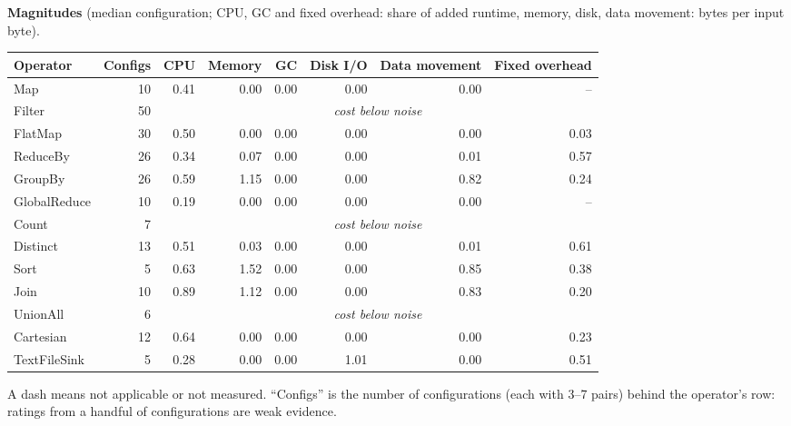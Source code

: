 \documentclass[11pt,a4paper]{article}
\begin{document}
\textbf{Magnitudes} (median configuration; CPU, GC and fixed overhead: share of added runtime, memory, disk, data movement: bytes per input byte).
\begin{center}\footnotesize\begin{tabular}{lrrrrrrr}\toprule

Operator & Configs & CPU & Memory & GC & Disk I/O & Data movement & Fixed overhead\\\midrule

Map & 10 & 0.41 & 0.00 & 0.00 & 0.00 & 0.00 & --\\

Filter & 50 & \multicolumn{6}{c}{\emph{cost below noise}}\\

FlatMap & 30 & 0.50 & 0.00 & 0.00 & 0.00 & 0.00 & 0.03\\

ReduceBy & 26 & 0.34 & 0.07 & 0.00 & 0.00 & 0.01 & 0.57\\

GroupBy & 26 & 0.59 & 1.15 & 0.00 & 0.00 & 0.82 & 0.24\\

GlobalReduce & 10 & 0.19 & 0.00 & 0.00 & 0.00 & 0.00 & --\\

Count & 7 & \multicolumn{6}{c}{\emph{cost below noise}}\\

Distinct & 13 & 0.51 & 0.03 & 0.00 & 0.00 & 0.01 & 0.61\\

Sort & 5 & 0.63 & 1.52 & 0.00 & 0.00 & 0.85 & 0.38\\

Join & 10 & 0.89 & 1.12 & 0.00 & 0.00 & 0.83 & 0.20\\

UnionAll & 6 & \multicolumn{6}{c}{\emph{cost below noise}}\\

Cartesian & 12 & 0.64 & 0.00 & 0.00 & 0.00 & 0.00 & 0.23\\

TextFileSink & 5 & 0.28 & 0.00 & 0.00 & 1.01 & 0.00 & 0.51\\
\bottomrule\end{tabular}\end{center}

A dash means not applicable or not measured. ``Configs'' is the number of configurations (each with 3--7 pairs) behind the operator's row: ratings from a handful of configurations are weak evidence.
\end{document}
